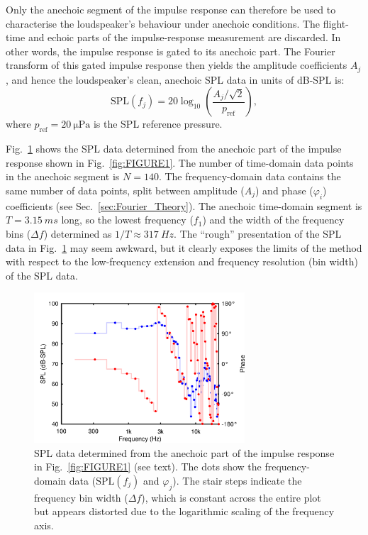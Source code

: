 \documentclass[12pt,a4paper]{article}
\providecommand{\secn}[1]{Sec.~\ref{sec:#1}}
\providecommand{\figlabel}[1]{\label{fig:#1}}
\providecommand{\figr}[1]{Fig.~\ref{fig:#1}}
\providecommand{\pRef}{p_\mathrm{ref}}
\begin{document}
Only the anechoic segment of the impulse response can therefore be used to characterise the loudspeaker’s behaviour under anechoic conditions. The flight-time and echoic parts of the impulse-response measurement are discarded. In other words, the impulse response is gated to its anechoic part. The Fourier transform of this gated impulse response then yields the amplitude coefficients $A_j$, and hence the loudspeaker’s clean, anechoic SPL data in units of dB-SPL is:
\[
\mathrm{SPL}(f_j) = 20 \log_{10}\left( \frac{A_j / \sqrt{2}}{\pRef} \right),
\]
where $\pRef = \SI{20}{\micro\pascal}$ is the SPL reference pressure.

\figr{FIGURE2} shows the SPL data determined from the anechoic part of the impulse response shown in \figr{FIGURE1}. The number of time-domain data points in the anechoic segment is $N = 140$. The frequency-domain data contains the same number of data points, split between amplitude ($A_j$) and phase ($\varphi_i$) coefficients (see \secn{Fourier_Theory}). The anechoic time-domain segment is $T = \SI{3.15}{ms}$ long, so the lowest frequency ($f_1$) and the width of the frequency bins ($\Delta f$) determined as $1/T \approx \SI{317}{Hz}$. The ``rough'' presentation of the SPL data in \figr{FIGURE2} may seem awkward, but it clearly exposes the limits of the method with respect to the low-frequency extension and frequency resolution (bin width) of the SPL data.

\begin{figure}[tbp]
  \begin{center}
    \includegraphics[width=0.7\textwidth]{FIGURE2}
    \caption{SPL data determined from the anechoic part of the impulse response in \figr{FIGURE1} (see text). The dots show the frequency-domain data ($\mathrm{SPL}(f_j)$ and $\varphi_j$). The stair steps indicate the frequency bin width ($\Delta f$), which is constant across the entire plot but appears distorted due to the logarithmic scaling of the frequency axis.}
    \figlabel{FIGURE2}
  \end{center}
\end{figure}
\end{document}
